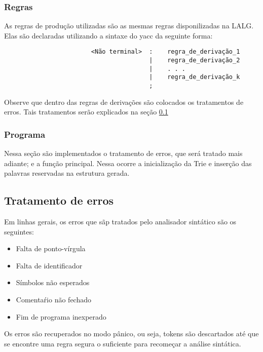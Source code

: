 \documentclass {article}
\begin{document}
		\subsubsection{Regras}
			As regras de produção utilizadas são as mesmas regras disponilizadas na LALG. Elas são declaradas utilizando a sintaxe do yacc da seguinte forma:
			\begin{center}
				\begin{minipage}[ht]{0.5\textwidth}
					\begin{verbatim}
						<Não terminal>  :    regra_de_derivação_1
						                |    regra_de_derivação_2
						                |    . . .
						                |    regra_de_derivação_k
						                ;
					\end{verbatim}
				\end{minipage}
			\end{center}

			Observe que dentro das regras de derivações são colocados os tratamentos de erros. Tais tratamentos serão explicados na seção \ref{section:error}
			
		\subsubsection{Programa}
			Nessa seção são implementados o tratamento de erros, que será tratado mais adiante; e a função principal. Nessa ocorre a inicialização da Trie e inserção das palavras reservadas na estrutura gerada.

	\subsection{Tratamento de erros} \label{section:error}
		Em linhas gerais, os erros que sãp tratados pelo analisador sintático são os seguintes:
		
		\begin{itemize}
			\item Falta de ponto-vírgula
			\item Falta de identificador
			\item Símbolos não esperados
			\item Comentaŕio não fechado
			\item Fim de programa inexperado
		\end{itemize}

		Os erros são recuperados no modo pânico, ou seja, tokens são descartados até que se encontre uma regra segura o suficiente para recomeçar a análise sintática.
\end{document}
